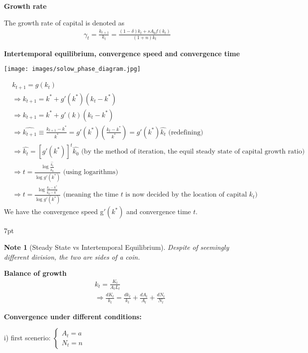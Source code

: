 \documentclass{article}
\newenvironment{blueblock}{
\def\FrameCommand{
  \hspace{1pt}
    {\color{DarkBlue}
    \vrule width 2pt}
    {\color{blueshade}
    \vrule width 4pt}
  \colorbox{blueshade}
}
\MakeFramed{
  \advance
  \hsize-
  \width
  \FrameRestore}
\noindent\hspace{-4.55pt}%
\begin{adjustwidth}{}{7pt}
\vspace{2pt}\vspace{2pt}
}
{\vspace{2pt}\end{adjustwidth}\endMakeFramed}
\newtheorem{note}{Note}
\begin{document}
\textbf{Growth rate}

The growth rate of capital is denoted as
\begin{align}
\gamma_t=\frac{k_{t+1}}{k_t}=\frac{(1-\delta)k_t+s A_0 f(k_t)}{(1+n)k_t}
\end{align}


\textbf{Intertemporal equilibrium, convergence speed and convergence
time} 

\texttt{[image: images/solow\_phase\_diagram.jpg]}

\begin{align}
&k_{t+1}=g(k_{t})
\\&\Rightarrow k_{t+1}=k^{*}+g'(k^{*})(k_{t}-k^{*})
\\&\Rightarrow k_{t+1}=k^{*}+g'(k)(k_{t}-k^{*})
\\&\Rightarrow \hat{k_{t+1}} \equiv \frac{k_{t+1}-k^{*}}{k^{*}}=g'(k^{*})(\frac{k_{t}-k^{*}}{k^{*}})=g'(k^{*})\hat{k_{t}} \text{ (redefining)}
\\&\Rightarrow\hat{k_{t}}=[g'(k^{*})]^{t}\hat{k_{0}} \text{ (by the method of iteration, the equil steady state of capital growth ratio)}
\\&\Rightarrow t=\frac{\log \frac{\hat{k_{t}}}{\hat{k_{0}}}}{\log g'(k^{*})} \text{ (using logarithms)}
\\&\Rightarrow t=\frac{\log \frac{k_{t}-k^{*}}{k_{0}-k^{*}}}{\log g'(k^{*})} \text{ (meaning the time } t \text{ is now decided by the location of capital } k_{t} \text{)}
\end{align}
We have the convergence speed g$'(k^{*})$ and convergence time $t$.


\begin{blueblock}
\begin{note}[Steady State vs Intertemporal Equilibrium]
Despite of seemingly different division, the two are sides of a coin.
\end{note}
\end{blueblock}

\textbf{Balance of growth} 
\begin{align}
&k_{t}=\frac{K_{t}}{A_{t}L_{t}}
\\&\Rightarrow \frac{dK_{t}}{k_{t}}=\frac{dk_{t}}{k_{t}}+\frac{dA_{t}}{A_{t}}+\frac{dN_{t}}{N_{t}}
\end{align}

\textbf{Convergence under different conditions:} 

i) first scenerio:
$\begin{cases}
A_{t}=a \\
N_{t}=n\end{cases}$
\end{document}
